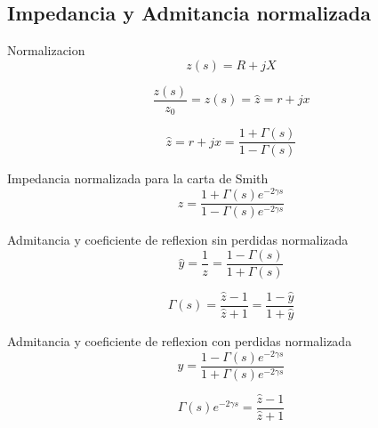 \documentclass[12pt,letterpaper]{article}
\begin{document}
\subsection{Impedancia y Admitancia normalizada}
Normalizacion
\begin{equation}
    z(s)=R+jX
\end{equation}

\begin{equation}
    \frac{z(s)}{z_0}=z(s)=\hat{z}=r+jx
\end{equation}

\begin{equation}
    \hat{z}=r+jx=\frac{1+\Gamma(s)}{1-\Gamma(s)}
\end{equation}

Impedancia normalizada para la carta de Smith
\begin{equation}
    \hat{z}=\frac{1+\Gamma(s)e^{-2 \gamma s}}{1-\Gamma(s)e^{-2 \gamma s}}
\end{equation}

Admitancia y coeficiente de reflexion sin perdidas normalizada
\begin{equation}
    \hat{y}=\frac{1}{z}=\frac{1-\Gamma(s)}{1+\Gamma(s)}
\end{equation}

\begin{equation}
    \Gamma(s)=\frac{\hat{z}-1}{\hat{z}+1}=\frac{1-\hat{y}}{1+\hat{y}}
\end{equation}

Admitancia y coeficiente de reflexion con perdidas normalizada
\begin{equation}
    \hat{y}=\frac{1-\Gamma(s)e^{-2 \gamma s}}{1+\Gamma(s)e^{-2 \gamma s}}
\end{equation}

\begin{equation}
    \Gamma(s)e^{-2 \gamma s}=\frac{\hat{z}-1}{\hat{z}+1}
\end{equation}
\end{document}
